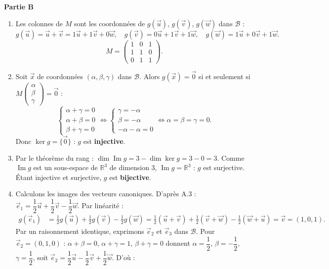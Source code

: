 \documentclass[11pt]{article}
\begin{document}
\begin{corrige}
\textbf{Partie B}
\begin{enumerate}
\item Les colonnes de $M$ sont les coordonnées de $g(\vec{u})$, $g(\vec{v})$, $g(\vec{w})$ dans $\mathcal{B}$ :
\[ g(\vec{u}) = \vec{u} + \vec{v} = 1\vec{u} + 1\vec{v} + 0\vec{w}, \quad g(\vec{v}) = 0\vec{u} + 1\vec{v} + 1\vec{w}, \quad g(\vec{w}) = 1\vec{u} + 0\vec{v} + 1\vec{w}. \]
\[ M = \begin{pmatrix} 1 & 0 & 1 \\ 1 & 1 & 0 \\ 0 & 1 & 1 \end{pmatrix}. \]
\item Soit $\vec{x}$ de coordonnées $(\alpha, \beta, \gamma)$ dans $\mathcal{B}$. Alors $g(\vec{x}) = \vec{0}$ si et seulement si $M \begin{pmatrix} \alpha \\ \beta \\ \gamma \end{pmatrix} = \vec{0}$ :
\[ \begin{cases} \alpha + \gamma = 0 \\ \alpha + \beta = 0 \\ \beta + \gamma = 0 \end{cases} \iff \begin{cases} \gamma = -\alpha \\ \beta = -\alpha \\ -\alpha - \alpha = 0 \end{cases} \iff \alpha = \beta = \gamma = 0. \]
Donc $\ker g = \{\vec{0}\}$ : $g$ est \textbf{injective}.
\item Par le théorème du rang : $\dim \operatorname{Im} g = 3 - \dim \ker g = 3 - 0 = 3$. Comme $\operatorname{Im} g$ est un sous-espace de $\mathbb{R}^3$ de dimension $3$, $\operatorname{Im} g = \mathbb{R}^3$ : $g$ est surjective. Étant injective et surjective, $g$ est \textbf{bijective}.
\item Calculons les images des vecteurs canoniques. D'après A.3 : $\vec{e}_1 = \dfrac{1}{2}\vec{u} + \dfrac{1}{2}\vec{v} - \dfrac{1}{2}\vec{w}$. Par linéarité :
\begin{align*}
g(\vec{e}_1) &= \frac{1}{2}g(\vec{u}) + \frac{1}{2}g(\vec{v}) - \frac{1}{2}g(\vec{w}) = \frac{1}{2}(\vec{u} + \vec{v}) + \frac{1}{2}(\vec{v} + \vec{w}) - \frac{1}{2}(\vec{w} + \vec{u}) = \vec{v} = (1, 0, 1).
\end{align*}
Par un raisonnement identique, exprimons $\vec{e}_2$ et $\vec{e}_3$ dans $\mathcal{B}$. Pour $\vec{e}_2 = (0,1,0)$ : $\alpha + \beta = 0$, $\alpha + \gamma = 1$, $\beta + \gamma = 0$ donnent $\alpha = \dfrac{1}{2}$, $\beta = -\dfrac{1}{2}$, $\gamma = \dfrac{1}{2}$, soit $\vec{e}_2 = \dfrac{1}{2}\vec{u} - \dfrac{1}{2}\vec{v} + \dfrac{1}{2}\vec{w}$. D'où :

\end{enumerate}
\end{corrige}
\end{document}

